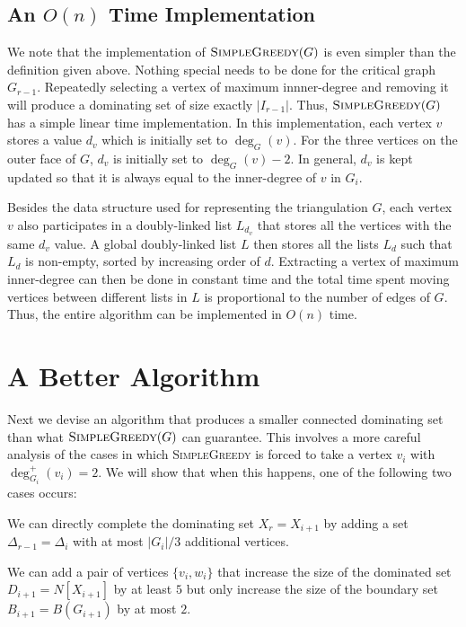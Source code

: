 \documentclass[12pt]{article}
\theoremstyle{definition}
\begin{document}
\subsection{An $O(n)$ Time Implementation}

We note that the implementation of $\textsc{SimpleGreedy}(G)$ is even simpler than the definition given above.  Nothing special needs to be done for the critical graph $G_{r-1}$.  Repeatedly selecting a vertex of maximum innner-degree and removing it will produce a dominating set of size exactly $|I_{r-1}|$.  Thus, $\textsc{SimpleGreedy}(G)$ has a simple linear time implementation.  In this implementation, each vertex $v$ stores a value $d_v$ which is initially set to $\deg_G(v)$.  For the three vertices on the outer face of $G$, $d_v$ is initially set to $\deg_G(v)-2$.  In general, $d_v$ is kept updated so that it is always equal to the inner-degree of $v$ in $G_i$.

Besides the data structure used for representing the triangulation $G$, each vertex $v$ also participates in a doubly-linked list $L_{d_v}$  that stores all the vertices with the same $d_v$ value.  A global doubly-linked list $L$ then stores all the lists $L_d$ such that $L_d$ is non-empty, sorted by increasing order of $d$.   Extracting a vertex of maximum inner-degree can then be done in constant time and the total time spent moving vertices between different lists in $L$ is proportional to the number of edges of $G$. Thus, the entire algorithm can be implemented in $O(n)$ time.

\section{A Better Algorithm}
\label{full_result}

Next we devise an algorithm that produces a smaller connected dominating set than what $\textsc{SimpleGreedy}(G)$ can guarantee.  This involves a more careful analysis of the cases in which \textsc{SimpleGreedy} is forced to take a vertex $v_i$ with $\deg^+_{G_i}(v_i)=2$.  We will show that when this happens, one of the following two cases occurs:
\begin{compactenum}
  \item We can directly complete the dominating set $X_r=X_{i+1}$ by adding a set $\Delta_{r-1}=\Delta_i$ with at most $|G_i|/3$ additional vertices.
  \item We can add a pair of vertices $\{v_i,w_i\}$ that increase the size of the dominated set $D_{i+1}=N[X_{i+1}]$ by at least $5$ but only increase the size of the boundary set $B_{i+1}=B(G_{i+1})$ by at most $2$.
\end{compactenum}
\end{document}
